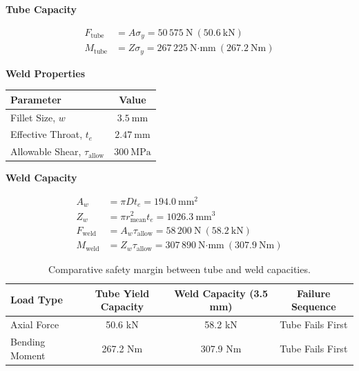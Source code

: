 \documentclass[11pt, a4paper]{report}
\numberwithin{equation}{section}
\begin{document}
\begin{refsection}
\noindent\textbf{Tube Capacity}\par
\vspace{4pt}
\begin{align*}
F_{\text{tube}} &= A \sigma_y
= 50\,575\ \text{N} \ (50.6\ \text{kN}) \\
M_{\text{tube}} &= Z \sigma_y
= 267\,225\ \text{N·mm} \ (267.2\ \text{Nm})
\end{align*}

\noindent\textbf{Weld Properties}\par
\vspace{4pt}
\begin{table}[h]
    \centering
    \begin{tabular}{|l|c|}
        \hline
        Parameter & Value \\
        \hline
        Fillet Size, $w$ & $3.5\ \text{mm}$ \\
        Effective Throat, $t_e$ & $2.47\ \text{mm}$ \\
        Allowable Shear, $\tau_{\text{allow}}$ & $300\ \text{MPa}$ \\
        \hline
    \end{tabular}
\end{table}
\vspace{6pt}

\noindent\textbf{Weld Capacity}\par
\vspace{4pt}
\begin{align*}
A_w &= \pi D t_e
= 194.0\ \text{mm}^2 \\
Z_w &= \pi r_{\text{mean}}^2 t_e
= 1026.3\ \text{mm}^3 \\
F_{\text{weld}} &= A_w \tau_{\text{allow}}
= 58\,200\ \text{N} \ (58.2\ \text{kN}) \\
M_{\text{weld}} &= Z_w \tau_{\text{allow}}
= 307\,890\ \text{N·mm} \ (307.9\ \text{Nm})
\end{align*}

\vspace{6pt}

\begin{table}[H]
    \centering
    \caption{Comparative safety margin between tube and weld capacities.}
    \vspace{-12pt}
    \label{tab:weld_vs_tube}
        \footnotesize
        \singlespacing
        \begin{tabular}{|l|c|c|c|}
        \hline
        \textbf{Load Type} & \textbf{Tube Yield Capacity} & \textbf{Weld Capacity (3.5 mm)} & \textbf{Failure Sequence} \\
        \hline
        Axial Force & 50.6 kN & 58.2 kN & Tube Fails First \\
        Bending Moment & 267.2 Nm & 307.9 Nm & Tube Fails First \\
        \hline
    \end{tabular}
\end{table}


\end{refsection}
\end{document}
